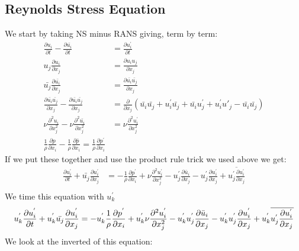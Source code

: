 \documentclass[a4paper,norsk]{article}
\begin{document}
\subsection*{Reynolds Stress Equation}
We start by taking NS minus RANS giving, term by term:
\begin{align*}
\frac{\partial u_i}{\partial t} - \frac{\partial \bar{u_i}}{\partial t} &= \frac{\partial u^{'}_i}{\partial t}\\
u_j \frac{\partial u_i}{\partial x_j} &= \frac{\partial u_iu_j}{\partial x_j} \\
\bar{u_j} \frac{\partial \bar{u_i}}{\partial x_j} &= \frac{\partial \bar{u_i}\bar{u_j}}{\partial x_j} \\
\frac{\partial \bar{u_i}\bar{u_j}}{\partial x_j} - \frac{\partial \bar{u_i}\bar{u_j}}{\partial x_j} &= \frac{\partial }{\partial x_j} (\bar{u_i}\bar{u_j} + u^{'}_i\bar{u_j} + \bar{u_i}u^{'}_j + u^{'}_i u{'}_j -\bar{u_i}\bar{u_j} )\\
\nu \frac{\partial^2 u_i}{\partial x_j^2} - \nu \frac{\partial^2 \bar{u_i}} {\partial x_j^2} &= \nu \frac{\partial^2 u^{'}_i} {\partial x_j^2} \\
\frac{1}{\rho}\frac{\partial p} {\partial x_i} - \frac{1}{\rho}\frac{\partial \bar{p}} {\partial x_i} = \frac{1}{\rho}\frac{\partial p^{'}} {\partial x_i}
\end{align*}
If we put these together and use the product rule trick we used above we get:
\begin{align*}
\frac{\partial u^{'}_i}{\partial t} + \bar{u_j} \frac{\partial u^{'}_i}{\partial x_j} &= - \frac{1}{\rho}\frac{\partial p^{'}} {\partial x_i} + \nu \frac{\partial^2 u^{'}_i} {\partial x_j^2} - u^{'}_j \frac{\partial \bar{u}_i}{\partial x_j} - 
u^{'}_j \frac{\partial u^{'}_i}{\partial x_j}  + \overline{u^{'}_j \frac{\partial u^{'}_i}{\partial x_j}}   \\
\end{align*}
We time this equation with $u_k^{'}$
\begin{equation}
u_k^{'}\frac{\partial u^{'}_i}{\partial t} + u_k^{'}\bar{u_j} \frac{\partial u^{'}_i}{\partial x_j} = - u_k^{'}\frac{1}{\rho}\frac{\partial p^{'}} {\partial x_i} + u_k^{'}\nu \frac{\partial^2 u^{'}_i} {\partial x_j^2} - u_k^{'}u^{'}_j \frac{\partial \bar{u}_i}{\partial x_j} - u_k^{'}u^{'}_j \frac{\partial u^{'}_i}{\partial x_j}  + u_k^{'}\overline{u^{'}_j \frac{\partial u^{'}_i}{\partial x_j}}   \\
\end{equation}
We look at the inverted of this equation:
\end{document}
